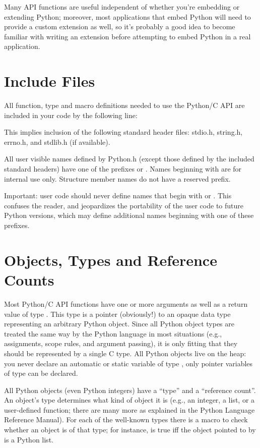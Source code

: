 Many API functions are useful independent of whether you're embedding 
or extending Python; moreover, most applications that embed Python 
will need to provide a custom extension as well, so it's probably a 
good idea to become familiar with writing an extension before 
attempting to embed Python in a real application.

\section{Include Files}

All function, type and macro definitions needed to use the Python/C
API are included in your code by the following line:


This implies inclusion of the following standard header files:
stdio.h, string.h, errno.h, and stdlib.h (if available).

All user visible names defined by Python.h (except those defined by
the included standard headers) have one of the prefixes  or
.  Names beginning with  are for internal use
only.  Structure member names do not have a reserved prefix.

Important: user code should never define names that begin with
 or .  This confuses the reader, and jeopardizes
the portability of the user code to future Python versions, which may
define additional names beginning with one of these prefixes.

\section{Objects, Types and Reference Counts}

Most Python/C API functions have one or more arguments as well as a
return value of type .  This type is a pointer
(obviously!)  to an opaque data type representing an arbitrary Python
object.  Since all Python object types are treated the same way by the
Python language in most situations (e.g., assignments, scope rules,
and argument passing), it is only fitting that they should be
represented by a single C type.  All Python objects live on the heap:
you never declare an automatic or static variable of type
, only pointer variables of type  can 
be declared.

All Python objects (even Python integers) have a ``type'' and a 
``reference count''.  An object's type determines what kind of object 
it is (e.g., an integer, a list, or a user-defined function; there are 
many more as explained in the Python Language Reference Manual).  For 
each of the well-known types there is a macro to check whether an 
object is of that type; for instance,  is true 
iff the object pointed to by  is a Python list.

